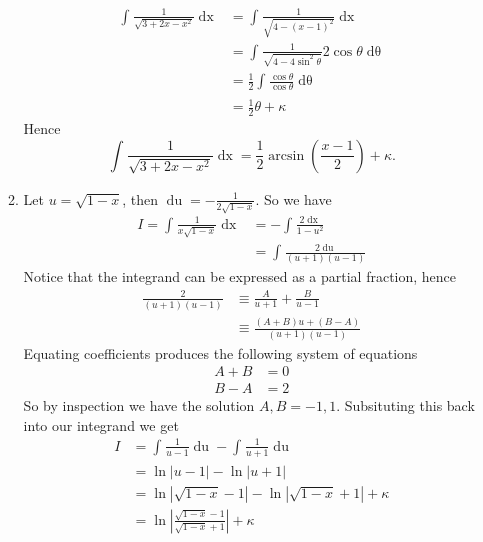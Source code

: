 \documentclass[12pt,oneside]{book}
\begin{document}
\begin{enumerate}
\begin{enumerate}
\begin{align*}
                \int_{}^{} \frac{1}{\sqrt{3 + 2x - x^2}} \mathop{\mathrm{d}x}  &= \int_{}^{} \frac{1}{\sqrt{4 - (x-1)^2} } \mathop{\mathrm{d}x} \\
                &= \int_{}^{} \frac{1}{\sqrt{4 - 4 \sin^2 \theta} } 2 \cos \theta \mathop{\mathrm{d}\theta} \\
                &= \frac{1}{2} \int_{}^{} \frac{\cos \theta}{\cos \theta} \mathop{\mathrm{d}\theta} \\
                &= \frac{1}{2} \theta + \kappa
            \end{align*}
            Hence \[
                \int_{}^{} \frac{1}{\sqrt{3 + 2x - x^2}} \mathop{\mathrm{d}x} = \frac{1}{2} \arcsin \left( \frac{x-1}{2} \right) + \kappa
            .\] 
            \item Let $u = \sqrt{1-x}$, then $\mathop{\mathrm{d}u} = - \frac{1}{2\sqrt{1-x}}$. So we have \begin{align*}
                I = \int_{}^{} \frac{1}{x \sqrt{1-x} } \mathop{\mathrm{d}x} &= - \int_{}^{} \frac{2 \mathop{\mathrm{d}x} }{1 - u^2} \\
                &= \int_{}^{} \frac{2 \mathop{\mathrm{d}u}}{(u + 1) (u - 1)}    
            \end{align*} 
            Notice that the integrand can be expressed as a partial fraction, hence \begin{align*}
                \frac{2}{(u + 1) (u - 1)} &\equiv \frac{A}{u + 1} + \frac{B}{u - 1}\\
                &\equiv \frac{(A + B) u + (B - A)}{(u+1)(u-1)}
            \end{align*}
            Equating coefficients produces the following system of equations \begin{align*}
                A + B &= 0 \\
                B - A &= 2
            \end{align*}
            So by inspection we have the solution $A, B = -1, 1$. Subsituting this back into our integrand we get \begin{align*}
                I &= \int_{}^{} \frac{1}{u-1} \mathop{\mathrm{d}u} - \int_{}^{} \frac{1}{u + 1} \mathop{\mathrm{d}u} \\
                &= \ln \left| u - 1 \right| - \ln \left| u + 1 \right| \\
                &= \ln \left| \sqrt{1-x} -1 \right| - \ln \left| \sqrt{1-x} +1 \right| + \kappa \\
                &= \ln \left| \frac{\sqrt{1-x} -1}{\sqrt{1-x} +1} \right| + \kappa

\end{align*}
\end{enumerate}
\end{enumerate}
\end{document}
